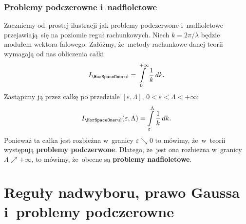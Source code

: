 \documentclass[10pt,t]{beamer}
\begin{document}
\begin{frame}[label=sld-Problemy-podczerwone-i-nadfioletowe]
  \frametitle{Problemy podczerowne i~nadfioletowe}


  Zaczniemy od~prostej ilustracji jak problemy podczerwone i~nadfioletowe
  przejawiają~się na poziomie reguł rachunkowych. Niech $k = 2 \pi / \lambda$
  będzie modułem wektora falowego. Załóżmy, że~metody rachunkowe danej
  teorii wymagają od nas obliczenia całki
  \begin{equation}
    \label{eq:Problemy-podczerwone-i-nadfioletowe-01}
    I_{ \HorSpaceOne \text{rul} } = \int\limits_{ 0 }^{ +\infty } \frac{ 1 }{ k } \, dk.
  \end{equation}
  Zastąpimy ją przez całkę po przedziale $[ \varepsilon, \Lambda ]$, $0 < \varepsilon < \Lambda < +\infty$:
  \begin{equation}
    \label{eq:Problemy-podczerwone-i-nadfioletowe-02}
    I_{ \HorSpaceOne \text{rul} }( \varepsilon, \Lambda ) =
    \int\limits_{ \varepsilon }^{ \Lambda } \frac{ 1 }{ k } \, dk.
  \end{equation}
  Ponieważ ta całka jest rozbieżna w~granicy $\varepsilon \searrow 0$ to mówimy,
  że~w~teorii występują \textbf{problemy podczerwone}. Dlatego, że~jest ona
  rozbieżna w~granicy $\Lambda \nearrow +\infty$, to mówimy, że~obecne są
  \textbf{problemy nadfioletowe}.

\end{frame}










\section{Reguły nadwyboru, prawo Gaussa i~problemy podczerowne}
\end{document}
